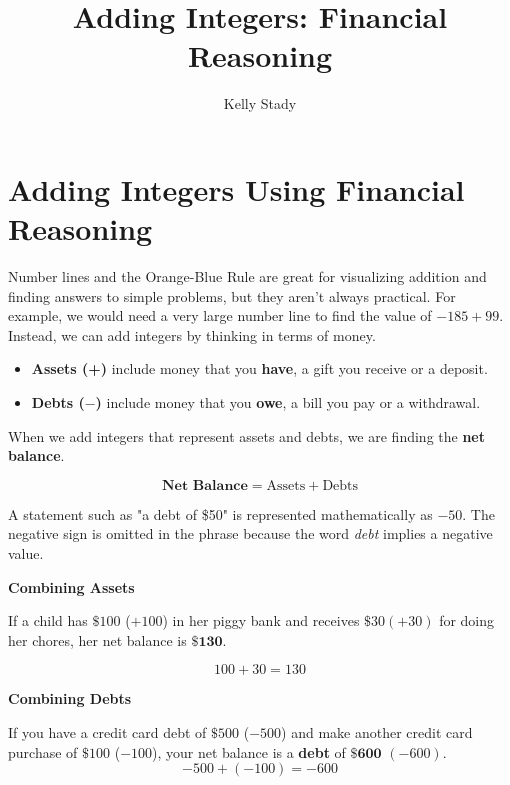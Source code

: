 \documentclass{ximera}[font=12pt]
\title{Adding Integers: Financial Reasoning}   %
\author{Kelly Stady}
\begin{document}
\begin{abstract}

\end{abstract}

\maketitle
\label{xim:AddIntMoneyActivity}


\section*{Adding Integers Using Financial Reasoning}

Number lines and the Orange-Blue Rule are great for visualizing addition and finding answers to simple problems, but they aren't 
always practical.  For example, we would need a very large number line to find the value of $-185 + 99.$  Instead, we can add 
integers by thinking in terms of money.


\begin{itemize}
\item \textbf{Assets (+)} include money that you \textbf{have}, a gift you receive or a deposit.

\item \textbf{Debts ($-$)} include money that you \textbf{owe}, a bill you pay or a withdrawal.

\end{itemize}


When we add integers that represent assets and debts, we are finding the \textbf{net balance}.

\[ \textbf{Net Balance} = \textrm{Assets} + \textrm{Debts} \]

\begin{remark}
A statement such as "a debt of \$50" is represented mathematically as $-50$. 
The negative sign is omitted in the phrase because the word \emph{debt} implies a negative value.
\end{remark}

\begin{example}  \textcolor{accessibleOrange}{\textbf{Combining Assets}} 
    
    If a child has $\$100$ ($+100$) in her piggy bank and receives $\$30 (+30)$ for doing her chores, her net 
     balance is $\mathbf{\$130}.$

    \[ 100 + 30 = 130 \]
\end{example}

\begin{example} \textcolor{accessibleOrange}{\textbf{Combining Debts}} 
    
    If you have a credit card debt of $\$500$ ($-500$) and make another credit card purchase of 
    $\$100$ ($-100$), your net balance is a \textbf{debt} of $\mathbf{\$600}$ $(-600)$.
    \[ -500 + (-100) = -600 \]
\end{example}
\end{document}
